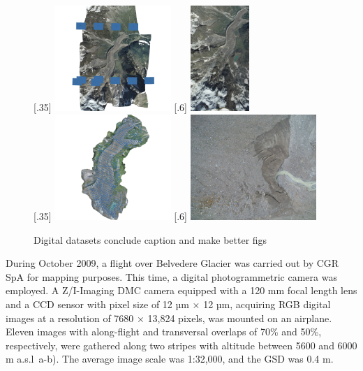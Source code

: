 \begin{figure}
    \centering
    \subcaptionbox{\label{fig:2:datasets_digital:2009_block}}[.35\textwidth]{
        \includegraphics[height=4cm]{2009_block} \hfill
    } 
    \subcaptionbox{\label{fig:2:datasets_digital:2009_img}}[.6\textwidth]{
        \includegraphics[height=4cm]{2009_img}
    } \\
    \subcaptionbox{\label{fig:2:datasets_digital:2019_block}}[.35\textwidth]{
        \includegraphics[height=4cm]{2019_block} \hfill
    } 
    \subcaptionbox{\label{fig:2:datasets_digital:2019_img}}[.6\textwidth]{
        \includegraphics[height=4cm]{2019_img}
    } \\
    \caption{Digital datasets {\color{red} conclude caption and make better figs}}
    \label{fig:2:datasets_digital}
\end{figure}


During October 2009, a flight over Belvedere Glacier was carried out by CGR SpA for mapping purposes. 
This time, a digital photogrammetric camera was employed.
A Z/I-Imaging DMC camera equipped with a 120 mm focal length lens and a CCD
sensor with pixel size of 12 µm × 12 µm, acquiring RGB digital images at a resolution of
7680 × 13,824 pixels, was mounted on an airplane. 
Eleven images with along-flight and transversal overlaps of 70\% and 50\%, respectively, were gathered along two stripes with altitude between 5600 and 6000 m a.s.l~a-b). 
The average image scale was 1:32,000, and the GSD was 0.4 m.


